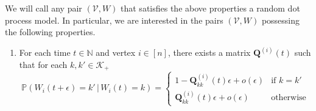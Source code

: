 \documentclass[draftcls]{IEEEtran}
\begin{document}
We will call any pair $(\mathscr{V}, W)$ that satisfies the above
properties a random dot process model. In particular, we are
interested in the pairs $(\mathscr{V}, W)$ possessing the following
properties. 
\begin{enumerate}
\item For each time $t \in \mathbb{N}$ and vertex $i \in [n]$, there
  exists a matrix $\mathbf{Q}^{(i)}(t)$ such that for each $k,k' \in
  \mathscr{K}_{+}$
  \begin{equation}
    \label{eq:3}
    \mathbb{P}(W_{i}(t + \epsilon) = k' \, | \, W_{i}(t) = k)
    = \begin{cases}
      1 - \mathbf{Q}_{kk}^{(i)}(t)\epsilon + o(\epsilon) & \text{if $k
        = k'$} \\
      \mathbf{Q}_{kk}^{(i)}(t)\epsilon + o(\epsilon) &
      \text{otherwise}
    \end{cases}
  \end{equation}
\end{enumerate}


\end{document}
